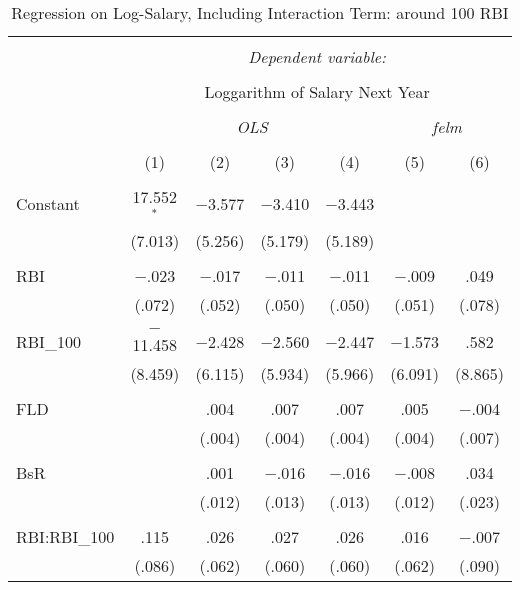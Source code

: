 
\begin{table}[H] \centering
  \caption{Regression on Log-Salary, Including Interaction Term: around 100 RBI}
  \label{RBI100_A}
\tiny
\begin{tabular}{@{\extracolsep{5pt}}lcccccc}
\\[-1.8ex]\hline
\hline \\[-1.8ex]
 & \multicolumn{6}{c}{\textit{Dependent variable:}} \\
\cline{2-7}
\\[-1.8ex] & \multicolumn{6}{c}{Loggarithm of Salary Next Year} \\
\\[-1.8ex] & \multicolumn{4}{c}{\textit{OLS}} & \multicolumn{2}{c}{\textit{felm}} \\
\\[-1.8ex] & (1) & (2) & (3) & (4) & (5) & (6)\\
\hline \\[-1.8ex]
 Constant & 17.552$^{*}$ & $-$3.577 & $-$3.410 & $-$3.443 &  &  \\
  & (7.013) & (5.256) & (5.179) & (5.189) &  &  \\
  & & & & & & \\
 RBI & $-$.023 & $-$.017 & $-$.011 & $-$.011 & $-$.009 & .049 \\
  & (.072) & (.052) & (.050) & (.050) & (.051) & (.078) \\
  & & & & & & \\
 RBI\_100 & $-$11.458 & $-$2.428 & $-$2.560 & $-$2.447 & $-$1.573 & .582 \\
  & (8.459) & (6.115) & (5.934) & (5.966) & (6.091) & (8.865) \\
  & & & & & & \\
 FLD &  & .004 & .007 & .007 & .005 & $-$.004 \\
  &  & (.004) & (.004) & (.004) & (.004) & (.007) \\
  & & & & & & \\
 BsR &  & .001 & $-$.016 & $-$.016 & $-$.008 & .034 \\
  &  & (.012) & (.013) & (.013) & (.012) & (.023) \\
  & & & & & & \\
 RBI:RBI\_100 & .115 & .026 & .027 & .026 & .016 & $-$.007 \\
  & (.086) & (.062) & (.060) & (.060) & (.062) & (.090) \\

\end{tabular}
\end{table}
